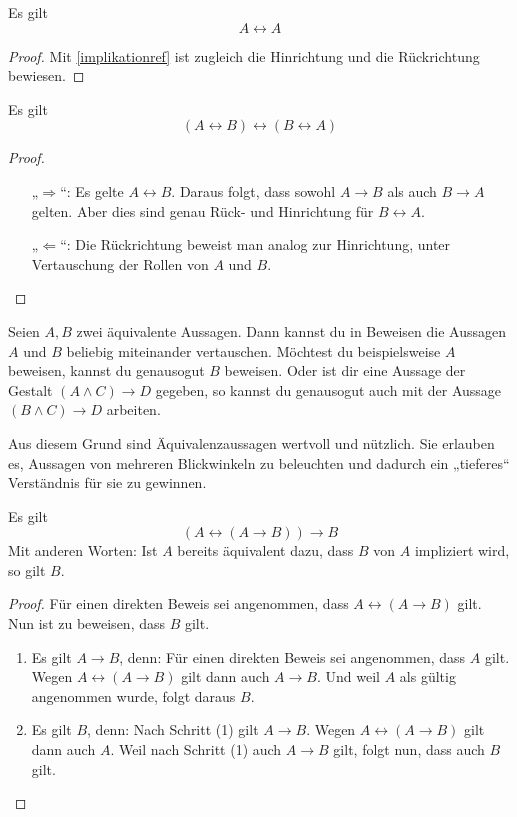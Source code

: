 \begin{satz}\label{iffref}
    Es gilt
        \[ A\leftrightarrow A \]
\end{satz}
\begin{proof}
    Mit \cref{implikationref} ist zugleich die Hinrichtung und die Rückrichtung bewiesen.
\end{proof}


\begin{satz}\label{iffkomm}
    Es gilt
        \[ (A\leftrightarrow B)\leftrightarrow(B\leftrightarrow A) \]
\end{satz}
\begin{proof}
    \begin{enumerate}
        \item[„$\Rightarrow$“:] Es gelte $A\leftrightarrow B$. Daraus folgt, dass sowohl $A\to B$ als auch $B\to A$ gelten. Aber dies sind genau Rück- und Hinrichtung für $B\leftrightarrow A$.
        \item[„$\Leftarrow$“:] Die Rückrichtung beweist man analog zur Hinrichtung, unter Vertauschung der Rollen von $A$ und $B$. \qedhere
    \end{enumerate}
\end{proof}


\begin{bem}[Substitutionsprinzip] 
    Seien $A,B$ zwei äquivalente Aussagen. Dann kannst du in Beweisen die Aussagen $A$ und $B$ beliebig miteinander vertauschen. Möchtest du beispielsweise $A$ beweisen, kannst du genausogut $B$ beweisen. Oder ist dir eine Aussage der Gestalt $(A\land C)\to D$ gegeben, so kannst du genausogut auch mit der Aussage $(B\land C)\to D$ arbeiten.
    
    Aus diesem Grund sind Äquivalenzaussagen wertvoll und nützlich. Sie erlauben es, Aussagen von mehreren Blickwinkeln zu beleuchten und dadurch ein „tieferes“ Verständnis für sie zu gewinnen.
\end{bem}


\begin{satz} \label{curryparadox}
    Es gilt
        \[ (A\leftrightarrow (A\to B))\to B \]
    Mit anderen Worten: Ist $A$ bereits äquivalent dazu, dass $B$ von $A$ impliziert wird, so gilt $B$.
\end{satz}
\begin{proof}
    Für einen direkten Beweis sei angenommen, dass $A\leftrightarrow (A\to B)$ gilt. Nun ist zu beweisen, dass $B$ gilt.
    \begin{enumerate}[(1)]
        \item Es gilt $A\to B$, denn: Für einen direkten Beweis sei angenommen, dass $A$ gilt. Wegen $A\leftrightarrow (A\to B)$ gilt dann auch $A\to B$. Und weil $A$ als gültig angenommen wurde, folgt daraus $B$.
        \item Es gilt $B$, denn: Nach Schritt (1) gilt $A\to B$. Wegen $A\leftrightarrow (A\to B)$ gilt dann auch $A$. Weil nach Schritt (1) auch $A\to B$ gilt, folgt nun, dass auch $B$ gilt. \qedhere
    \end{enumerate}
\end{proof}


